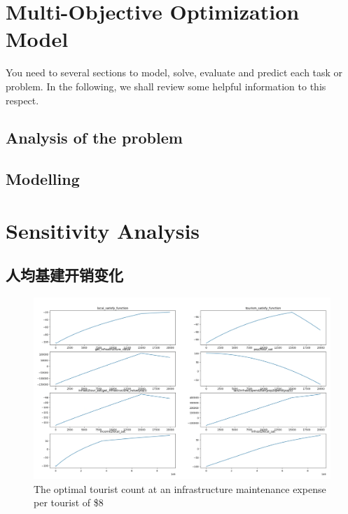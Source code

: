 \documentclass[12pt]{article}  %
\begin{document}
 \section{Multi-Objective Optimization Model}
 
 You need to several sections to model, solve, evaluate and predict each task or problem. In the following, we shall review some helpful information to this respect.
 
 \subsection{Analysis of the problem}
 
 \subsection{Modelling}
 
 

 \section{Sensitivity Analysis}
 \subsection{人均基建开销变化}
 
 
 \begin{figure}[H]  %
 
 \centering  %
 \includegraphics[width=.9\textwidth]{sensitivity12.png} %
 \caption{The optimal tourist count at an infrastructure maintenance expense per tourist of \$8} %
 \label{figx}%
 \end{figure}
\end{document}
